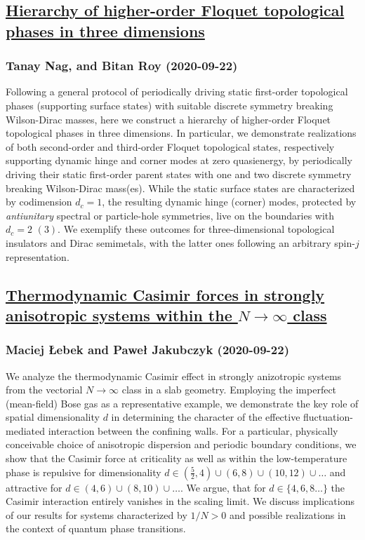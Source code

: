 {\subsection*{\href{http://arxiv.org/abs/2009.10719v1}{Hierarchy of higher-order Floquet topological phases in three dimensions}}
\subsubsection*{Tanay Nag, and Bitan Roy (2020-09-22)}
Following a general protocol of periodically driving static first-order
topological phases (supporting surface states) with suitable discrete symmetry
breaking Wilson-Dirac masses, here we construct a hierarchy of higher-order
Floquet topological phases in three dimensions. In particular, we demonstrate
realizations of both second-order and third-order Floquet topological states,
respectively supporting dynamic hinge and corner modes at zero quasienergy, by
periodically driving their static first-order parent states with one and two
discrete symmetry breaking Wilson-Dirac mass(es). While the static surface
states are characterized by codimension $d_c=1$, the resulting dynamic hinge
(corner) modes, protected by \emph{antiunitary} spectral or particle-hole
symmetries, live on the boundaries with $d_c=2$ $(3)$. We exemplify these
outcomes for three-dimensional topological insulators and Dirac semimetals,
with the latter ones following an arbitrary spin-$j$ representation.

\subsection*{\href{http://arxiv.org/abs/2009.10718v1}{Thermodynamic Casimir forces in strongly anisotropic systems within the  $N\to \infty$ class}}
\subsubsection*{Maciej Łebek and Paweł Jakubczyk (2020-09-22)}
We analyze the thermodynamic Casimir effect in strongly anizotropic systems
from the vectorial $N\to\infty$ class in a slab geometry. Employing the
imperfect (mean-field) Bose gas as a representative example, we demonstrate the
key role of spatial dimensionality $d$ in determining the character of the
effective fluctuation-mediated interaction between the confining walls. For a
particular, physically conceivable choice of anisotropic dispersion and
periodic boundary conditions, we show that the Casimir force at criticality as
well as within the low-temperature phase is repulsive for dimensionality $d\in
(\frac{5}{2},4)\cup (6,8)\cup (10,12)\cup\dots$ and attractive for $d\in
(4,6)\cup (8,10)\cup \dots$. We argue, that for $d\in\{4,6,8\dots\}$ the
Casimir interaction entirely vanishes in the scaling limit. We discuss
implications of our results for systems characterized by $1/N>0$ and possible
realizations in the context of quantum phase transitions.

}
